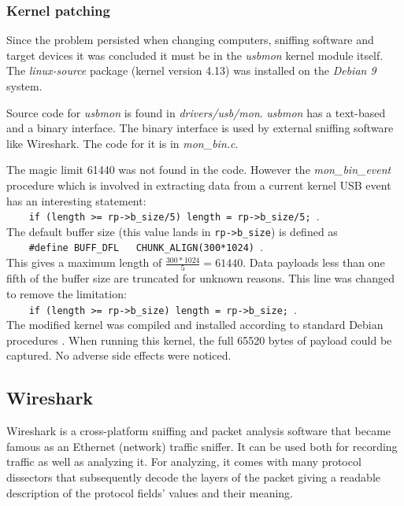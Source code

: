 \documentclass{article}
\begin{document}
\subsubsection{Kernel patching}
\label{ssec:kernelpatch}

Since the problem persisted when changing computers, sniffing software and target devices
it was concluded it must be in the {\it usbmon} kernel module itself.
The {\it linux-source} package (kernel version 4.13) was installed on the {\it Debian 9} system.

Source code for {\it usbmon} is found in {\it drivers/usb/mon}. {\it usbmon} has a
text-based and a binary interface. The binary interface is used by external sniffing
software like Wireshark. The code for it is in {\it mon\_bin.c}.

The magic limit 61440 was not found in the code. However the {\it mon\_bin\_event} procedure
which is involved in extracting data from a current kernel USB event has an interesting statement: \\
\verb|    if (length >= rp->b_size/5) length = rp->b_size/5; |. \\
The default buffer size (this value lands in \verb|rp->b_size|) is defined as \\
\verb|    #define BUFF_DFL   CHUNK_ALIGN(300*1024) |. \\
This gives a maximum length of $\frac{300*1024}{5} = 61440$. Data payloads less
than one fifth of the buffer size are truncated for unknown reasons.
This line was changed to remove the limitation: \\
\verb|    if (length >= rp->b_size) length = rp->b_size; |. \\
The modified kernel was compiled and installed according to standard Debian procedures \cite{debkernel}.
When running this kernel, the full 65520 bytes of payload could be captured.
No adverse side effects were noticed.

\subsection{Wireshark}
\label{ssec:wireshark}

Wireshark \cite{wireshark} is a cross-platform sniffing and packet analysis software that
became famous as an Ethernet (network) traffic sniffer.
It can be used both for recording traffic as well as analyzing it.
For analyzing, it comes with many protocol dissectors that subsequently
decode the layers of the packet giving a readable description of the protocol fields'
values and their meaning.
\end{document}
